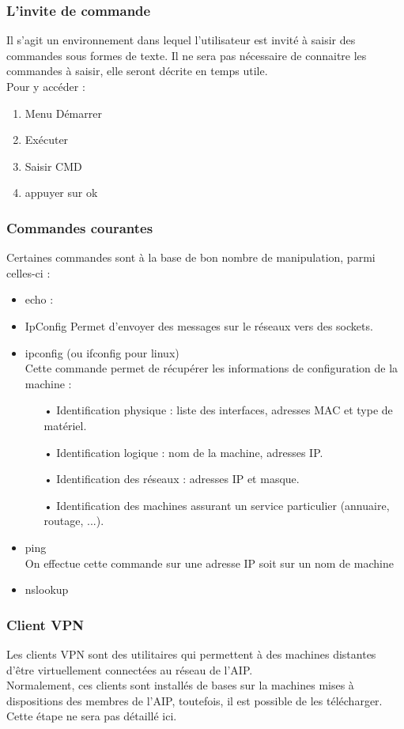 \documentclass[a4paper]{article}
\begin{document}
\subsubsection{L'invite de commande}
Il s'agit un environnement dans lequel l'utilisateur est invité à saisir des commandes sous formes de texte.
Il ne sera pas nécessaire de connaitre les commandes à saisir, elle seront décrite en temps utile.\\
Pour y accéder :
\begin{enumerate}
	\item Menu Démarrer
	\item Exécuter
	\item Saisir CMD
	\item appuyer sur ok
\end{enumerate}
\subsubsection{Commandes courantes}
Certaines commandes sont à la base de bon nombre de manipulation, parmi celles-ci : 
\begin{itemize}
\item echo : \\
\item IpConfig
Permet d'envoyer des messages sur le réseaux vers des sockets.  
\item ipconfig (ou ifconfig pour linux)\\
Cette commande permet de récupérer les informations de configuration de la machine : \\
\begin{itemize}
\item[•]Identification physique : liste des interfaces, adresses MAC et type de matériel.
\item[•]Identification logique : nom de la machine, adresses IP.
\item[•]Identification des réseaux : adresses IP et masque.
\item[•]Identification des machines assurant un service particulier (annuaire, routage, ...).
\end{itemize}
\item ping \\
On effectue cette commande sur une adresse IP soit sur un nom de machine 
\item nslookup

\end{itemize}

\subsubsection{Client VPN}
Les clients VPN sont des utilitaires qui permettent à des machines distantes d'être virtuellement connectées au réseau de l'AIP.\\
Normalement, ces clients sont installés de bases sur la machines mises à dispositions des membres de l'AIP, toutefois, il est possible de les télécharger. Cette étape ne sera pas détaillé ici.
\end{document}

